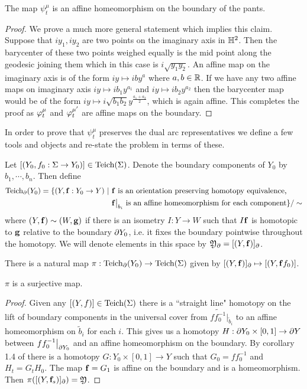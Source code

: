 \begin{proposition}
  The map $\psi^\mu_t$ is an affine homeomorphism on the boundary of the pants.
\end{proposition}
\begin{proof}
  We prove a much more general statement which implies this claim. Suppose that $iy_1, iy_2$ are two points on the imaginary axis in $\mathbb{H}^2$. Then the barycenter of these two points weighed equally is the mid point along the geodesic joining them which in this case is $i\sqrt{y_1y_2}$. An affine map on the imaginary axis is of the form $ iy\mapsto iby^a$ where $a,b\in \mathbb{R}$. If we have any two affine maps on imaginary axis $iy \mapsto ib_1y^{a_1}$ and $iy\mapsto ib_2y^{a_2}$ then the barycenter map would be of the form $iy\mapsto i\sqrt{b_1b_2}y^{\frac{a_1+a_2}{2}}$, which is again affine. This completes the proof as $\varphi^\mu_t$ and $\varphi^{\mu'}_t$ are affine maps on the boundary. 
\end{proof}
In order to prove that $\psi^\mu_t$ preserves the dual arc representatives we define a few tools and objects and re-state the problem in terms of these. 
\begin{definition}
  Let $[(Y_0, f_0:\Sigma\to Y_0)]\in \text{Teich}(\Sigma)$. Denote the boundary components of $Y_0$ by $b_1,\cdots, b_n$. Then define
  \begin{align*}
    \T_\pa(Y_0) = \{(Y,\fs:Y_0\to Y)\ |\ &\fs\ \text{is an orientation preserving homotopy equivalence,}\\ &\fs\big|_{b_i}\ \text{is an affine homeomorphism for each component} \}/\sim
  \end{align*}
  where $(Y,\mathbf{f})\sim (W,\mathbf{g})$ if there is an isometry $I:Y\to W$ such that $I\mathbf{f}$ is homotopic to $\mathbf{g}$ relative to the boundary $\partial Y_0$, i.e. it fixes the boundary pointwise throughout the homotopy. We will denote elements in this space by $ \mathfrak{Y}_\partial = [(Y,\mathbf{f})]_\partial$.
\end{definition}
There is a natural map $\pi: \text{Teich}_\partial(Y_0) \to \text{Teich}(\Sigma)$ given by $[(Y,\mathbf{f})]_\partial \mapsto [(Y, \mathbf{f} f_0)]$. 
\begin{proposition}\label{pro:surjective}
  $\pi$ is a surjective map.
\end{proposition}
\begin{proof}
  Given any $[(Y,f)]\in \text{Teich}(\Sigma)$ there is a ``straight line" homotopy on the lift of boundary components in the universal cover from $\widetilde{ff_0^{-1}}\big|_{\tilde{b}_i}$ to an affine homeomorphism on $\tilde{b}_i$ for each $i$. This gives us a homotopy $H: \partial Y_0\times [0,1]\to \partial Y$ between $ff_0^{-1}\big|_{\partial Y_0}$ and an affine homeomorphism on the boundary. By corollary 1.4 of \cite{kirby} there is a homotopy $G:Y_0\times [0,1]\to Y$ such that $G_0 = ff_0^{-1}$ and $H_t = G_tH_0$. The map $\mathbf{f} = G_1$ is affine on the boundary and is a homeomorphism. Then $\pi([(Y,\mathbf{f}_s)]_\partial) = \mathfrak{Y}$.
\end{proof}
